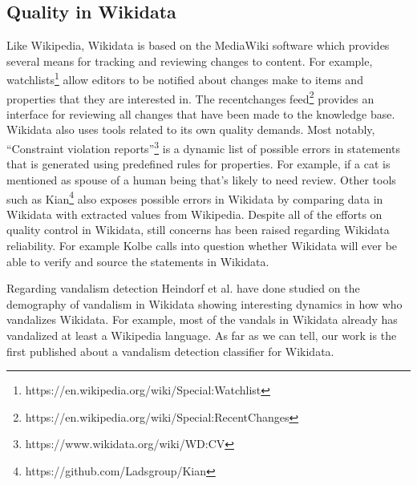 \documentclass{sig-alternate}
\begin{document}
\subsection{Quality in Wikidata}
Like Wikipedia, Wikidata is based on the MediaWiki software which provides several means for tracking and reviewing changes to content. For example, watchlists\footnote{https://en.wikipedia.org/wiki/Special:Watchlist} allow editors to be notified about changes make to items and properties that they are interested in. The recentchanges feed\footnote{https://en.wikipedia.org/wiki/Special:RecentChanges} provides an interface for reviewing all changes that have been made to the knowledge base. Wikidata also uses tools related to its own quality demands. Most notably, ``Constraint violation reports''\footnote{https://www.wikidata.org/wiki/WD:CV} is a dynamic list of possible errors in statements that is generated using predefined rules for properties.  For example, if a cat is mentioned as spouse of a human being that's likely to need review. Other tools such as Kian\footnote{https://github.com/Ladsgroup/Kian} also exposes possible errors in Wikidata by comparing data in Wikidata with extracted values from Wikipedia. Despite all of the efforts on quality control in Wikidata, still concerns has been raised regarding Wikidata reliability. For example Kolbe\cite{kolbe:whither} calls into question whether Wikidata will ever be able to verify and source the statements in Wikidata.

Regarding vandalism detection Heindorf et al. have done studied on the demography of vandalism in Wikidata\cite{heindorf:towards} showing interesting dynamics in how who vandalizes Wikidata. For example, most of the vandals in Wikidata already has vandalized at least a Wikipedia language.\cite{heindorf:towards} As far as we can tell, our work is the first published about a vandalism detection classifier for Wikidata.
\end{document}
